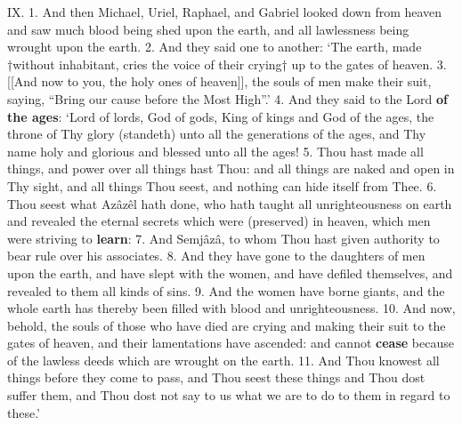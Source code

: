 IX. 1. And then Michael, Uriel, Raphael, and
Gabriel looked down from heaven and saw much
blood being shed upon the earth, and all lawlessness
being wrought upon the earth. 2. And they said one
to another: ‘The earth, made †without inhabitant,
cries the voice of their crying† up to the gates of
heaven. 3. [[And now to you, the holy ones of
heaven]], the souls of men make their suit, saying,
“Bring our cause before the Most High”.’ 4. And
they said to the Lord \textbf{of the ages}: ‘Lord of lords,
God of gods, King of kings and God of the ages,
the throne of Thy glory (standeth) unto all the
generations of the ages, and Thy name holy and
glorious and blessed unto all the ages! 5. Thou
hast made all things, and power over all things hast
Thou: and all things are naked and open in Thy
sight, and all things Thou seest, and nothing can hide
itself from Thee. 6. Thou seest what Azâzêl hath
done, who hath taught all unrighteousness on earth
and revealed the eternal secrets which were (preserved)
in heaven, which men were striving to \textbf{learn}: 7. And
Semjâzâ, to whom Thou hast given authority to
bear rule over his associates. 8. And they have
gone to the daughters of men upon the earth, and
have slept with the women, and have defiled themselves,
and revealed to them all kinds of sins. 9. And
the women have borne giants, and the whole earth
has thereby been filled with blood and unrighteousness.
10. And now, behold, the souls of those who
have died are crying and making their suit to the
gates of heaven, and their lamentations have ascended:
and cannot \textbf{cease} because of the lawless
deeds which are wrought on the earth. 11. And Thou
knowest all things before they come to pass, and
Thou seest these things and Thou dost suffer them,
and Thou dost not say to us what we are to do to
them in regard to these.’

